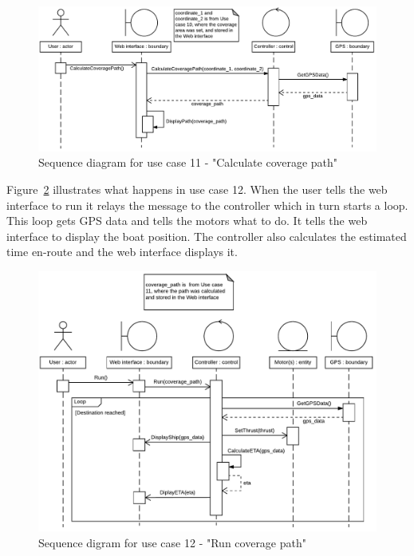\begin{figure}[H]
\centering
\includegraphics[width=1\linewidth]{../Appendix/Project/Dokumentation/Images/System_architecture/Use_case_11_SD}
\caption{Sequence diagram for use case 11 - "Calculate coverage path"}
\label{fig:usecase11sd}
\end{figure}

Figure~\ref{fig:usecase12sd} illustrates what happens in use case 12. When the user tells the web interface to run it relays the message to the controller which in turn starts a loop. This loop gets GPS data and tells the motors what to do. It tells the web interface to display the boat position. The controller also calculates the estimated time en-route and the web interface displays it.

\begin{figure}[H]
\centering
\includegraphics[width=1\linewidth]{../Appendix/Project/Dokumentation/Images/System_architecture/Use_case_12_SD}
\caption{Sequence digram for use case 12 - "Run coverage path"}
\label{fig:usecase12sd}
\end{figure}

